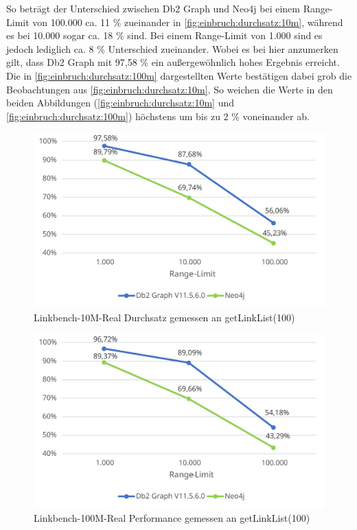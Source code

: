 So beträgt der Unterschied zwischen Db2 Graph und Neo4j bei einem Range-Limit von 100.000 ca. 11 \% zueinander in \autoref{fig:einbruch:durchsatz:10m}, während es bei 10.000 sogar ca. 18 \% sind. Bei einem Range-Limit von 1.000 sind es jedoch lediglich ca. 8 \% Unterschied zueinander. Wobei es bei hier anzumerken gilt, dass Db2 Graph mit 97,58 \% ein außergewöhnlich hohes Ergebnis erreicht. Die in \autoref{fig:einbruch:durchsatz:100m} dargestellten Werte bestätigen dabei grob die Beobachtungen aus \autoref{fig:einbruch:durchsatz:10m}. So weichen die Werte in den beiden Abbildungen (\autoref{fig:einbruch:durchsatz:10m} und \autoref{fig:einbruch:durchsatz:100m}) höchstens um bis zu 2 \% voneinander ab. 

\begin{figure}[!ht]
    \centering
    \includegraphics[width=\textwidth]{images/diagramme/limit_relative_durchsatz_real_10m.pdf}
    \caption{Linkbench-10M-Real Durchsatz gemessen an getLinkList(100)}
    \label{fig:einbruch:durchsatz:10m}
\end{figure}

\begin{figure}[!ht]
    \centering
    \includegraphics[width=\textwidth]{images/diagramme/limit_relative_durchsatz_real_100m.pdf}
    \caption{Linkbench-100M-Real Performance gemessen an getLinkList(100)}
    \label{fig:einbruch:durchsatz:100m}
\end{figure}

